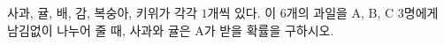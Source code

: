 사과, 귤, 배, 감, 복숭아, 키위가 각각 $1$개씩 있다. 이 $6$개의 과일을 A, B, C $3$명에게 남김없이 나누어 줄 때, 사과와 귤은 A가 받을 확률을 구하시오. 
